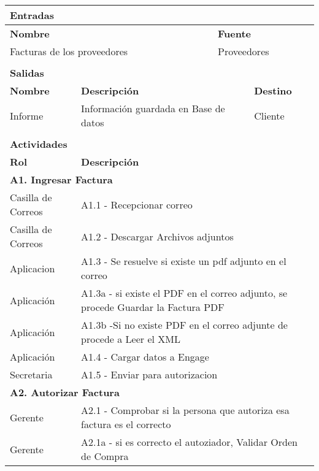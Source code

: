 \begin{longtable}{|llrrrrrr|}
    \multicolumn{8}{|l|}{\textbf{Entradas}} \\ \hline
    \multicolumn{5}{|l|}{\textbf{Nombre}}   & \multicolumn{3}{|l|}{\textbf{Fuente}} \\ \hline
    \multicolumn{5}{|l|}{Facturas de los proveedores} & \multicolumn{3}{|l|}{Proveedores} \\  \hline
       &       &       &       &       &       &       &  \\ \hline
    \multicolumn{8}{|l|}{\textbf{Salidas}} \\ \hline
    \textbf{Nombre} & \multicolumn{5}{|l|}{\textbf{Descripción}} & \multicolumn{2}{|l|}{\textbf{Destino}} \\ \hline
    Informe & \multicolumn{5}{|l|}{Información guardada en Base de datos} & \multicolumn{2}{|l|}{Cliente} \\ \hline
       &       &       &       &       &       &       &  \\ \hline
\multicolumn{8}{|l|}{\textbf{Actividades}} \\ \hline
    \textbf{Rol} & \multicolumn{7}{|l|}{\textbf{Descripción}} \\ \hline
    \multicolumn{8}{|l|}{\textbf{A1. Ingresar Factura}} \\ \hline
   Casilla de Correos & \multicolumn{7}{|l|}{A1.1 - Recepcionar correo } \\ \hline 
   Casilla de Correos & \multicolumn{7}{|l|}{A1.2 - Descargar Archivos adjuntos  } \\ \hline
   Aplicacion & \multicolumn{7}{|l|}{A1.3 - Se resuelve si existe un pdf adjunto en el correo  } \\ \hline
   Aplicación & \multicolumn{7}{|m{12cm}|}{A1.3a - si existe el PDF en el correo adjunto, se procede Guardar la Factura PDF} \\ \hline
   Aplicación & \multicolumn{7}{|m{12cm}|}{A1.3b -Si no existe PDF en el correo adjunte de procede a Leer el XML} \\ \hline
   Aplicación& \multicolumn{7}{|l|}{A1.4 - Cargar datos a Engage} \\ \hline
   Secretaria & \multicolumn{7}{|l|}{A1.5 - Enviar para autorizacion} \\ \hline
    \multicolumn{8}{|l|}{\textbf{A2. Autorizar Factura}} \\ \hline
    Gerente & \multicolumn{7}{|m{12cm}|}{A2.1 - Comprobar si la persona que autoriza esa factura es el correcto} \\ \hline
    Gerente & \multicolumn{7}{|l|}{A2.1a - si es correcto el autoziador, Validar Orden de Compra } \\ \hline

\end{longtable}
